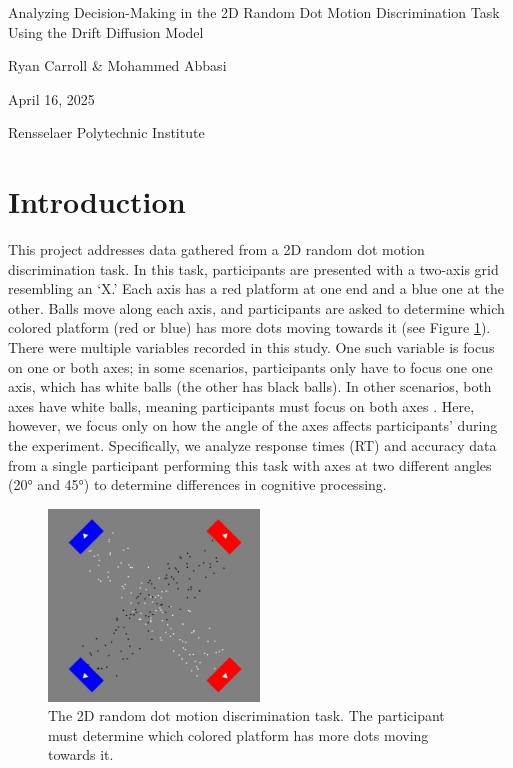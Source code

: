 \documentclass[12pt]{article}
\begin{document}
\begin{titlepage}
    \begin{center}
        \Huge
        \vspace*{\fill}
        Analyzing Decision-Making in the 2D Random Dot Motion Discrimination Task Using the Drift Diffusion Model

        \vspace{3cm}
        \Large
        Ryan Carroll \& Mohammed Abbasi

        \vspace{3cm}
        April 16, 2025

        \vspace{3cm}
        Rensselaer Polytechnic Institute

        \vspace*{\fill}
    \end{center}
\end{titlepage}

\section{Introduction}

This project addresses data gathered from a 2D random dot motion discrimination task. In this task, participants are presented with a two-axis grid resembling an `X.' Each axis has a red platform at one end and a blue one at the other. Balls move along each axis, and participants are asked to determine which colored platform (red or blue) has more dots moving towards it (see Figure \ref{fig:task}). There were multiple variables recorded in this study. One such variable is focus on one or both axes; in some scenarios, participants only have to focus one one axis, which has white balls (the other has black balls). In other scenarios, both axes have white balls, meaning participants must focus on both axes \cite{krzeminski_zhang_2020}. Here, however, we focus only on how the angle of the axes affects participants' during the experiment. Specifically, we analyze response times (RT) and accuracy data from a single participant performing this task with axes at two different angles (20° and 45°) to determine differences in cognitive processing.
\begin{figure}[ht]
    \centering
    \includegraphics[width=0.5\textwidth]{2drdk_part1.2400x2400.jpeg}
    \caption{The 2D random dot motion discrimination task. The participant must determine which colored platform has more dots moving towards it.}
    \label{fig:task}
\end{figure}
\end{document}
